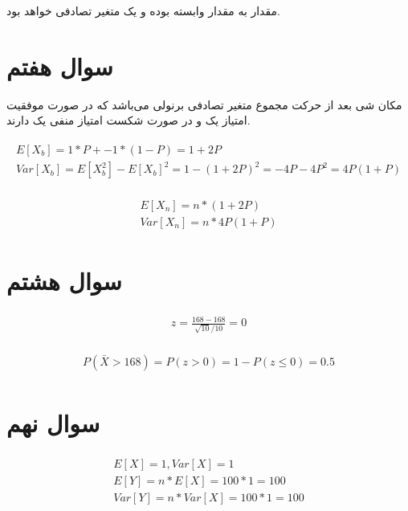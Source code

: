\documentclass[paper=a4, fontsize=11pt]{article}
\numberwithin{equation}{section} %
\numberwithin{figure}{section} %
\numberwithin{table}{section} %
\begin{document}
مقدار 
به مقدار  وابسته بوده و یک متغیر تصادفی خواهد بود.


\section{سوال هفتم}

مکان شی بعد از 
حرکت مجموع 
متغیر تصادفی برنولی می‌باشد که
در صورت موفقیت امتیاز یک و در صورت شکست امتیاز منفی یک دارند.

\begin{align}
\begin{split}
    E[X_b] = 1 * P + -1 * (1 - P) =  1 + 2P\\
    Var[X_b] = E[X_b^2] - E[X_b]^2 = 1 - (1 + 2P)^2 = -4P - 4P^2 = 4P(1 + P)
\end{split}
\end{align}

\begin{align}
\begin{split}
    E[X_n] = n * (1 + 2P) \\
    Var[X_n] = n * 4P(1 + P)
\end{split}
\end{align}


\section{سوال هشتم}

\begin{align}
\begin{split}
    z = \frac{168 - 168}{\sqrt{10}/10} = 0
\end{split}
\end{align}

\begin{align}
\begin{split}
    P(\bar{X} > 168) = P(z > 0) = 1 - P(z \le 0) = 0.5 
\end{split}
\end{align}

\section{سوال نهم}

\begin{align}
\begin{split}
    E[X] = 1, Var[X] = 1\\
    E[Y] = n * E[X] = 100 * 1 = 100\\
    Var[Y] = n * Var[X]  = 100 * 1 = 100\\
\end{split}
\end{align}
\end{document}
